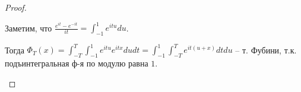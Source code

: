 \begin{proof}
\begin{enumerate}
{            Заметим, что $\frac{e^{it} - e^{-it}}{it} = \int_{-1}^{1} e^{i t u} du$.

            Тогда $\Phi_{T}(x) = \int_{-T}^{T} \int_{-1}^{1} e^{i t u} e^{i t x} du dt = \int_{-1}^{1} \int_{-T}^{T} e^{i t (u + x)} dt du$ -- т. Фубини, т.к. подъинтегральная ф-я по модулю равна $1$.


        }
    \end{enumerate}














\end{proof}
